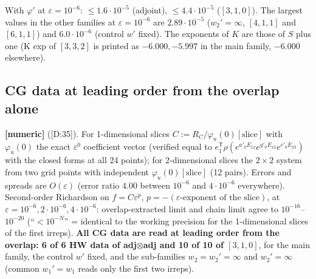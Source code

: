 \documentclass[10pt]{article}
\newcommand{\cl}[2]{\textsf{[#1:#2]}}
\newcommand{\tg}[1]{\textbf{[#1]}}
\begin{document}
With $\varphi'$ at $\varepsilon=10^{-6}$: $\le1.6\cdot10^{-5}$ (adjoint), $\le4.4\cdot10^{-5}$ ($[3,1,0]$). The largest values in the other families at $\varepsilon=10^{-6}$ are $2.89\cdot10^{-5}$ ($w_2'=\infty$, $[4,1,1]$ and $[6,1,1]$) and $6.0\cdot10^{-6}$ (control $w'$ fixed). The exponents of $K$ are those of $S$ plus one (K exp of $[3,3,2]$ is printed as $-6.000,-5.997$ in the main family, $-6.000$ elsewhere).

\subsection{CG data at leading order from the overlap alone}\label{sec:DCG}

\tg{numeric} (\cl{D}{35}). For 1-dimensional slices $C:=R_C/\varphi_u(0)[\text{slice}]$ with $\varphi_u(0)$ the exact $\varepsilon^0$ coefficient vector (verified equal to $e_1^{\mathsf T}\rho(e^{a'_0E_{12}}e^{g'_0E_{13}}e^{c'_0E_{23}})$ with the closed forms at all 24 points); for 2-dimensional slices the $2\times2$ system from two grid points with independent $\varphi_u(0)[\text{slice}]$ (12 pairs). Errors and spreads are $O(\varepsilon)$ (error ratio $4.00$ between $10^{-6}$ and $4\cdot10^{-6}$ everywhere). Second-order Richardson on $f=C\varepsilon^p$, $p=-(\varepsilon\text{-exponent of the slice})$, at $\varepsilon=10^{-6},2\cdot10^{-6},4\cdot10^{-6}$: overlap-extracted limit and chain limit agree to $10^{-16}$--$10^{-20}$ (``$<10^{-N}$'' = identical to the working precision for the 1-dimensional slices of the first irreps). \textbf{All CG data are read at leading order from the overlap: 6 of 6 HW data of adj$\otimes$adj and 10 of 10 of $[3,1,0]$}, for the main family, the control $w'$ fixed, and the sub-families $w_2=w_2'=\infty$ and $w_2'=\infty$ (common $w_1'=w_1$ reads only the first two irreps).
\end{document}
